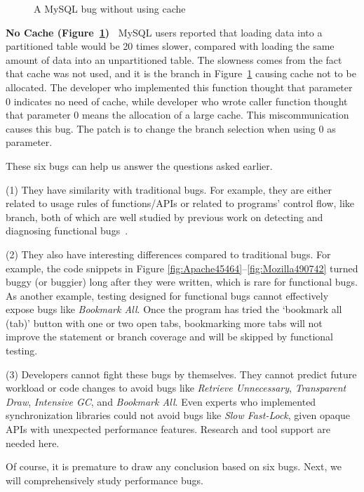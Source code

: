 \begin{figure}
\caption{A MySQL bug without using cache}
\label{fig:MySQL26527}
\end{figure}

{\bf No Cache (Figure~\ref{fig:MySQL26527})\ }
MySQL users reported that loading data into a partitioned table would be 20 times slower, 
compared with loading the same amount of data into an unpartitioned table. 
The slowness comes from the fact that cache was not used, 
and it is the branch in Figure~\ref{fig:MySQL26527} causing cache not to be allocated. 
The developer who implemented this  function thought that parameter 0 indicates no need of cache, 
while developer who wrote caller function thought that parameter 0 means the allocation of a large cache. 
This miscommunication causes this bug. 
The patch is to change the branch selection when using 0 as parameter. 

These six bugs can help us answer the questions asked earlier.


(1) They have similarity with traditional bugs.
For example, they are either related to usage rules of functions/APIs or related to programs' control flow, like branch,
both of which are well studied by previous work on detecting and diagnosing functional 
bugs~\citep{PRMiner05,livshits05dynamine,liblit05}.

(2) They also have interesting differences compared to traditional bugs.
For example, the code snippets in Figure 
\ref{fig:Apache45464}--\ref{fig:Mozilla490742}
turned buggy (or buggier) long after they were written,
which is rare for functional bugs.
As another example, testing designed for functional bugs
cannot effectively expose bugs like {\it Bookmark All}. 
Once the program has tried the `bookmark all (tab)' button with one or two open tabs,
bookmarking more tabs will not improve the statement or branch coverage and
will be skipped by functional testing.

(3) Developers cannot fight these bugs by themselves.
They cannot predict future workload
or code changes to avoid bugs like {\it Retrieve Unnecessary}, {\it Transparent Draw}, 
{\it Intensive GC}, and
{\it Bookmark All}. Even experts
who implemented synchronization libraries
could not avoid bugs like {\it Slow Fast-Lock}, 
given opaque APIs with unexpected performance features.
Research and tool support are needed here.

Of course, it is premature to draw any conclusion based on six bugs.
Next, we will comprehensively study \allbugs performance bugs.

